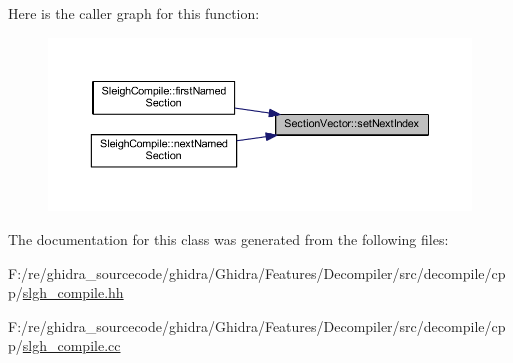 Here is the caller graph for this function\+:
\nopagebreak
\begin{figure}[H]
\begin{center}
\leavevmode
\includegraphics[width=350pt]{class_section_vector_a1bffcc372bb98f06fcfabdeddd068019_icgraph}
\end{center}
\end{figure}


The documentation for this class was generated from the following files\+:\begin{DoxyCompactItemize}
\item 
F\+:/re/ghidra\+\_\+sourcecode/ghidra/\+Ghidra/\+Features/\+Decompiler/src/decompile/cpp/\mbox{\hyperlink{slgh__compile_8hh}{slgh\+\_\+compile.\+hh}}\item 
F\+:/re/ghidra\+\_\+sourcecode/ghidra/\+Ghidra/\+Features/\+Decompiler/src/decompile/cpp/\mbox{\hyperlink{slgh__compile_8cc}{slgh\+\_\+compile.\+cc}}\end{DoxyCompactItemize}
